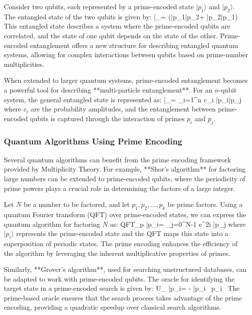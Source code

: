 \documentclass[12pt]{article}
\begin{document}
Consider two qubits, each represented by a prime-encoded state \( |p_1\rangle \) and \( |p_2\rangle \). The entangled state of the two qubits is given by:
\]
|\psi_{}\rangle =  (|p_1\rangle \otimes |p_2\rangle + |p_2\rangle \otimes |p_1\rangle)
\]
This entangled state describes a system where the prime-encoded qubits are correlated, and the state of one qubit depends on the state of the other. Prime-encoded entanglement offers a new structure for describing entangled quantum systems, allowing for complex interactions between qubits based on prime-number multiplicities.

When extended to larger quantum systems, prime-encoded entanglement becomes a powerful tool for describing **multi-particle entanglement**. For an \( n \)-qubit system, the general entangled state is represented as:
\]
|\psi_{}\rangle = \sum_{i=1}^{n} c_i |p_i\rangle \otimes |p_j\rangle
\]
where \( c_i \) are the probability amplitudes, and the entanglement between prime-encoded qubits is captured through the interaction of primes \( p_i \) and \( p_j \).

\subsubsection{Quantum Algorithms Using Prime Encoding}

Several quantum algorithms can benefit from the prime encoding framework provided by Multiplicity Theory. For example, **Shor's algorithm** for factoring large numbers can be extended to prime-encoded qubits, where the periodicity of prime powers plays a crucial role in determining the factors of a large integer.

Let \( N \) be a number to be factored, and let \( p_1, p_2, \dots, p_k \) be prime factors. Using a quantum Fourier transform (QFT) over prime-encoded states, we can express the quantum algorithm for factoring \( N \) as:
\]
QFT_p |p_i\rangle =  \sum_{j=0}^{N-1} e^{2\pi i } |p_j\rangle
\]
where \( |p_i\rangle \) represents the prime-encoded state and the QFT maps this state into a superposition of periodic states. The prime encoding enhances the efficiency of the algorithm by leveraging the inherent multiplicative properties of primes.

Similarly, **Grover's algorithm**, used for searching unstructured databases, can be adapted to work with prime-encoded qubits. The oracle for identifying the target state in a prime-encoded search is given by:
\]
U_{} |p_i\rangle = - |p_i\rangle \quad {} \, p_i \, 
\]
The prime-based oracle ensures that the search process takes advantage of the prime encoding, providing a quadratic speedup over classical search algorithms.
\end{document}
